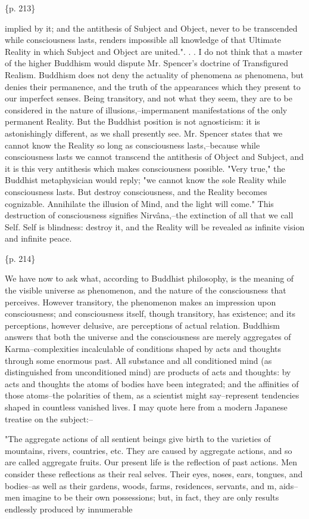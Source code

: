 \{p. 213\}

implied by it; and the antithesis of Subject and Object, never to be transcended while consciousness lasts, renders impossible all knowledge of that Ultimate Reality in which Subject and Object are united.". . . I do not think that a master of the higher Buddhism would dispute Mr. Spencer's doctrine of Transfigured Realism. Buddhism does not deny the actuality of phenomena as phenomena, but denies their permanence, and the truth of the appearances which they present to our imperfect senses. Being transitory, and not what they seem, they are to be considered in the nature of illusions,--impermanent manifestations of the only permanent Reality. But the Buddhist position is not agnosticism: it is astonishingly different, as we shall presently see. Mr. Spencer states that we cannot know the Reality so long as consciousness lasts,--because while consciousness lasts we cannot transcend the antithesis of Object and Subject, and it is this very antithesis which makes consciousness possible. "Very true," the Buddhist metaphysician would reply; "we cannot know the sole Reality while consciousness lasts. But destroy consciousness, and the Reality becomes cognizable. Annihilate the illusion of Mind, and the light will come." This destruction of consciousness signifies Nirvâna,--the extinction of all that we call Self. Self is blindness: destroy it, and the Reality will be revealed as infinite vision and infinite peace.

\{p. 214\}

We have now to ask what, according to Buddhist philosophy, is the meaning of the visible universe as phenomenon, and the nature of the consciousness that perceives. However transitory, the phenomenon makes an impression upon consciousness; and consciousness itself, though transitory, has existence; and its perceptions, however delusive, are perceptions of actual relation. Buddhism answers that both the universe and the consciousness are merely aggregates of Karma--complexities incalculable of conditions shaped by acts and thoughts through some enormous past. All substance and all conditioned mind (as distinguished from unconditioned mind) are products of acts and thoughts: by acts and thoughts the atoms of bodies have been integrated; and the affinities of those atoms--the polarities of them, as a scientist might say--represent tendencies shaped in countless vanished lives. I may quote here from a modern Japanese treatise on the subject:--

"The aggregate actions of all sentient beings give birth to the varieties of mountains, rivers, countries, etc. They are caused by aggregate actions, and so are called aggregate fruits. Our present life is the reflection of past actions. Men consider these reflections as their real selves. Their eyes, noses, ears, tongues, and bodies--as well as their gardens, woods, farms, residences, servants, and m, aids-- men imagine to be their own possessions; but, in fact, they are only results endlessly produced by innumerable

